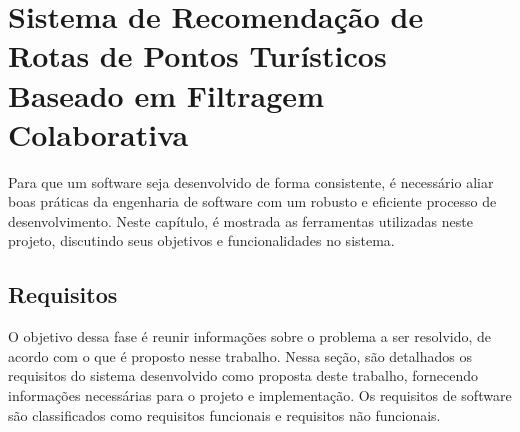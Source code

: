 \chapter{Sistema de Recomendação de Rotas de Pontos Turísticos Baseado em Filtragem Colaborativa}
\label{chp:eTourismRecSys}

Para que um software seja desenvolvido de forma consistente, é necessário aliar boas práticas da engenharia de software com um robusto e eficiente processo de desenvolvimento. Neste capítulo, é mostrada as ferramentas utilizadas neste projeto, discutindo seus objetivos e funcionalidades no sistema.

\section{Requisitos}
\label{sec:requirements}

O objetivo dessa fase é reunir informações sobre o problema a ser resolvido, de acordo com o que é proposto nesse trabalho. Nessa seção, são detalhados os requisitos do sistema desenvolvido como proposta deste trabalho, fornecendo informações necessárias para o projeto e implementação. Os requisitos de software são classificados como requisitos funcionais e requisitos não funcionais.



